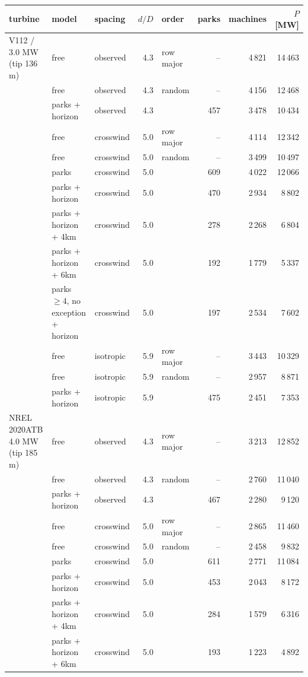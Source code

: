 \begin{tabular}{lllrlrrr}
\toprule
turbine & model & spacing & $d/D$ & order & parks & machines & $P$ [\si{\mega\watt}] \\
\midrule
V112 / 3.0 MW (tip 136 m) & free & observed & 4.3 & row major & -- & 4\,821 & 14\,463 \\
 & free & observed & 4.3 & random & -- & 4\,156 & 12\,468 \\
 & parks + horizon & observed & 4.3 &  & 457 & 3\,478 & 10\,434 \\
 & free & crosswind & 5.0 & row major & -- & 4\,114 & 12\,342 \\
 & free & crosswind & 5.0 & random & -- & 3\,499 & 10\,497 \\
 & parks & crosswind & 5.0 &  & 609 & 4\,022 & 12\,066 \\
 & parks + horizon & crosswind & 5.0 &  & 470 & 2\,934 & 8\,802 \\
 & parks + horizon + 4km & crosswind & 5.0 &  & 278 & 2\,268 & 6\,804 \\
 & parks + horizon + 6km & crosswind & 5.0 &  & 192 & 1\,779 & 5\,337 \\
 & parks $\geq 4$, no exception + horizon & crosswind & 5.0 &  & 197 & 2\,534 & 7\,602 \\
 & free & isotropic & 5.9 & row major & -- & 3\,443 & 10\,329 \\
 & free & isotropic & 5.9 & random & -- & 2\,957 & 8\,871 \\
 & parks + horizon & isotropic & 5.9 &  & 475 & 2\,451 & 7\,353 \\
\midrule
NREL 2020ATB 4.0 MW (tip 185 m) & free & observed & 4.3 & row major & -- & 3\,213 & 12\,852 \\
 & free & observed & 4.3 & random & -- & 2\,760 & 11\,040 \\
 & parks + horizon & observed & 4.3 &  & 467 & 2\,280 & 9\,120 \\
 & free & crosswind & 5.0 & row major & -- & 2\,865 & 11\,460 \\
 & free & crosswind & 5.0 & random & -- & 2\,458 & 9\,832 \\
 & parks & crosswind & 5.0 &  & 611 & 2\,771 & 11\,084 \\
 & parks + horizon & crosswind & 5.0 &  & 453 & 2\,043 & 8\,172 \\
 & parks + horizon + 4km & crosswind & 5.0 &  & 284 & 1\,579 & 6\,316 \\
 & parks + horizon + 6km & crosswind & 5.0 &  & 193 & 1\,223 & 4\,892 \\

\end{tabular}
